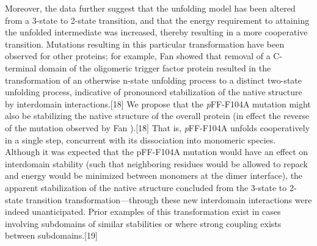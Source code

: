 \begin{refsection}
Moreover, the data further suggest that the unfolding model has been altered
from a 3-state to 2-state transition, and that the energy requirement to
attaining the unfolded intermediate was increased, thereby resulting in a more
cooperative transition. Mutations resulting in this particular transformation
have been observed for other proteins; for example, Fan  showed
that removal of a C-terminal domain of the oligomeric  trigger
factor protein resulted in the transformation of an otherwise n-state unfolding
process to a distinct two-state unfolding process, indicative of pronounced
stabilization of the native structure by interdomain interactions.[18] We
propose that the \emph{p}FF-F104A mutation might also be stabilizing the native
structure of the overall protein (in effect the reverse of the mutation
observed by Fan ).[18] That is, \emph{p}FF-F104A unfolds
cooperatively in a single step, concurrent with its dissociation into monomeric
species. Although it was expected that the pFF-F104A mutation would have an
effect on interdomain stability (such that neighboring residues would be
allowed to repack and energy would be minimized between monomers at the dimer
interface), the apparent stabilization of the native structure concluded from
the 3-state to 2-state transition transformation—through these new interdomain
interactions were indeed unanticipated. Prior examples of this transformation
exist in cases involving subdomains of similar stabilities or where strong
coupling exists between subdomains.[19]


\end{refsection}
